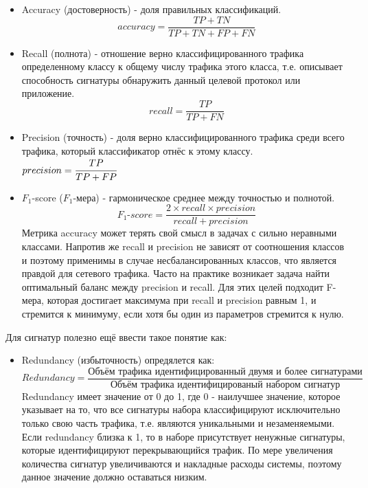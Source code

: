 \begin{itemize}
    \item Accuracy (достоверность) - доля правильных классификаций.
    $$ accuracy = \dfrac{TP + TN}{TP + TN + FP + FN} $$

    \item Recall (полнота) - отношение верно классифицированного трафика определенному классу к общему числу трафика этого класса,
    т.е. описывает способность сигнатуры обнаружить данный целевой протокол или приложение.
    $$ recall = \dfrac{TP}{TP + FN} $$

    \item Precision (точность) - доля верно классифицированного трафика среди всего трафика, который классификатор отнёс к этому классу.
    $ precision = \cfrac{TP}{TP + FP}$

    \item $F_1$-score ($F_1$-мера) - гармоническое среднее между точностью и полнотой.
     $$ \textit{$F_1$-score} = \dfrac{2 \times recall \times precision}{recall + precision} $$
    Метрика accuracy может терять свой смысл в задачах с сильно неравными классами.
    Напротив же recall и precision не зависят от соотношения классов и поэтому применимы в случае несбалансированных классов,
    что является правдой для сетевого трафика. Часто на практике возникает задача найти оптимальный баланс между precision
    и recall. Для этих целей подходит F-мера, которая достигает максимума при recall
    и precision равным 1, и стремится к минимуму, если хотя бы один из параметров стремится к нулю.


\end{itemize}

Для сигнатур полезно ещё ввести такое понятие как:

\begin{itemize}
    \item Redundancy (избыточность) опредялется как:
    $$ \textit{Redundancy} = \frac{\text{Объём трафика идентифицированный двумя и более сигнатурами}}{\text{Объём трафика идентифицированый набором сигнатур}}$$
    Redundancy имеет значение от 0 до 1, где 0 - наилучшее значение, которое указывает на то, что все сигнатуры набора классифицируют исключительно только свою часть трафика,
    т.е. являются уникальными и незаменяемыми. Если redundancy близка к 1, то в наборе присутствует ненужные сигнатуры, которые идентифицируют перекрывающийся трафик.
    По мере увеличения количества сигнатур увеличиваются и накладные расходы системы, поэтому данное значение должно оставаться низким.
\end{itemize}

